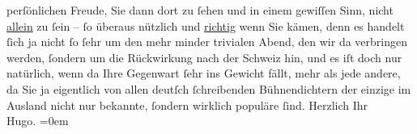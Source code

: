 \begin{ledgroupsized}[t]{13cm}
               perſönlichen Freude, Sie dann dort zu ſehen und in einem gewiſſen Sinn, nicht \uline{allein} zu ſein – ſo überaus nützlich und \uline{richtig} wenn Sie {\pb}kämen, denn es handelt ſich ja
               nicht ſo ſehr um den mehr minder trivialen Abend, den wir da verbringen werden,
               ſondern um die Rückwirkung nach der Schweiz
               hin, und es iſt doch nur natürlich, wenn da Ihre Gegenwart ſehr ins Gewicht fällt,
               mehr als jede andere, da Sie ja eigentlich von allen deutſch ſchreibenden
               Bühnendichtern der einzige \introOben{}im Ausland\introOben{} nicht nur bekannte,
               ſondern wirklich populäre ſind.\pend
           \pstart
           Herzlich Ihr{\\[\baselineskip]}\spacefill\mbox{Hugo.}\pend
           \leftskip=0em{}
         
         \endnumbering{}\end{ledgroupsized}  \newcommand{\dateiname}{L02259}\newcommand{\titel}{Hugo von Hofmannsthal an Arthur Schnitzler, 30. 4. [1917]}\newcommand{\editorInnen}{Martin Anton Müller und Gerd-Hermann Susen}
      